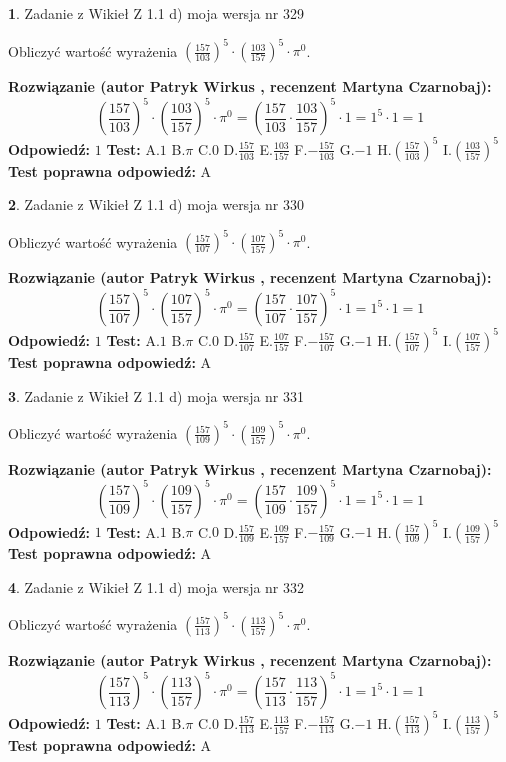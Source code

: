 \documentclass[12pt, a4paper]{article}
\theoremstyle{definition} %
\newtheorem{zad}{}
\newcommand{\zadStart}[1]{\begin{zad}#1\newline}
\newcommand{\zadStop}{\end{zad}}
\newcommand{\rozwStart}[2]{\noindent \textbf{Rozwiązanie (autor #1 , recenzent #2): }\newline}
\newcommand{\rozwStop}{\newline}
\newcommand{\odpStart}{\noindent \textbf{Odpowiedź:}\newline}
\newcommand{\odpStop}{\newline}
\newcommand{\testStart}{\noindent \textbf{Test:}\newline}
\newcommand{\testStop}{\newline}
\newcommand{\kluczStart}{\noindent \textbf{Test poprawna odpowiedź:}\newline}
\newcommand{\kluczStop}{\newline}
\begin{document}
\zadStart{Zadanie z Wikieł Z 1.1 d) moja wersja nr 329}

Obliczyć wartość wyrażenia $(\frac{157}{103})^{5} \cdot (\frac{103}{157})^{5} \cdot \pi^{0}$.
\zadStop
\rozwStart{Patryk Wirkus}{Martyna Czarnobaj}
$$(\frac{157}{103})^{5} \cdot (\frac{103}{157})^{5} \cdot \pi^{0} = (\frac{157}{103} \cdot \frac{103}{157})^{5} \cdot 1 = 1^{5} \cdot 1 = 1$$
\rozwStop
\odpStart
$1$
\odpStop
\testStart
A.$1$ B.$\pi$ C.$0$ D.$\frac{157}{103}$ E.$\frac{103}{157}$
F.$-\frac{157}{103}$ G.$-1$
H.$(\frac{157}{103})^{5}$
I.$(\frac{103}{157})^{5}$
\testStop
\kluczStart
A
\kluczStop



\zadStart{Zadanie z Wikieł Z 1.1 d) moja wersja nr 330}

Obliczyć wartość wyrażenia $(\frac{157}{107})^{5} \cdot (\frac{107}{157})^{5} \cdot \pi^{0}$.
\zadStop
\rozwStart{Patryk Wirkus}{Martyna Czarnobaj}
$$(\frac{157}{107})^{5} \cdot (\frac{107}{157})^{5} \cdot \pi^{0} = (\frac{157}{107} \cdot \frac{107}{157})^{5} \cdot 1 = 1^{5} \cdot 1 = 1$$
\rozwStop
\odpStart
$1$
\odpStop
\testStart
A.$1$ B.$\pi$ C.$0$ D.$\frac{157}{107}$ E.$\frac{107}{157}$
F.$-\frac{157}{107}$ G.$-1$
H.$(\frac{157}{107})^{5}$
I.$(\frac{107}{157})^{5}$
\testStop
\kluczStart
A
\kluczStop



\zadStart{Zadanie z Wikieł Z 1.1 d) moja wersja nr 331}

Obliczyć wartość wyrażenia $(\frac{157}{109})^{5} \cdot (\frac{109}{157})^{5} \cdot \pi^{0}$.
\zadStop
\rozwStart{Patryk Wirkus}{Martyna Czarnobaj}
$$(\frac{157}{109})^{5} \cdot (\frac{109}{157})^{5} \cdot \pi^{0} = (\frac{157}{109} \cdot \frac{109}{157})^{5} \cdot 1 = 1^{5} \cdot 1 = 1$$
\rozwStop
\odpStart
$1$
\odpStop
\testStart
A.$1$ B.$\pi$ C.$0$ D.$\frac{157}{109}$ E.$\frac{109}{157}$
F.$-\frac{157}{109}$ G.$-1$
H.$(\frac{157}{109})^{5}$
I.$(\frac{109}{157})^{5}$
\testStop
\kluczStart
A
\kluczStop



\zadStart{Zadanie z Wikieł Z 1.1 d) moja wersja nr 332}

Obliczyć wartość wyrażenia $(\frac{157}{113})^{5} \cdot (\frac{113}{157})^{5} \cdot \pi^{0}$.
\zadStop
\rozwStart{Patryk Wirkus}{Martyna Czarnobaj}
$$(\frac{157}{113})^{5} \cdot (\frac{113}{157})^{5} \cdot \pi^{0} = (\frac{157}{113} \cdot \frac{113}{157})^{5} \cdot 1 = 1^{5} \cdot 1 = 1$$
\rozwStop
\odpStart
$1$
\odpStop
\testStart
A.$1$ B.$\pi$ C.$0$ D.$\frac{157}{113}$ E.$\frac{113}{157}$
F.$-\frac{157}{113}$ G.$-1$
H.$(\frac{157}{113})^{5}$
I.$(\frac{113}{157})^{5}$
\testStop
\kluczStart
A
\kluczStop
\end{document}
